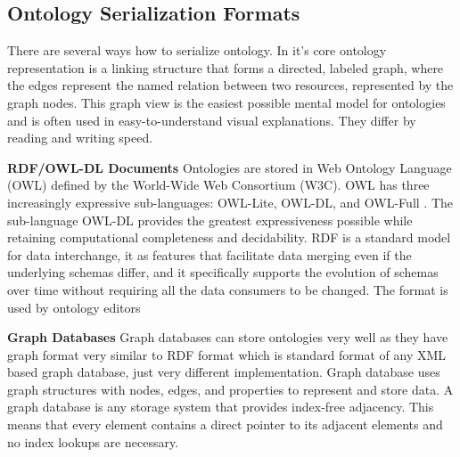 \subsection{Ontology Serialization Formats}

There are several ways how to serialize ontology. In it's core ontology representation is a linking structure that forms a directed, labeled graph, where the edges represent the named relation between two resources, represented by the graph nodes. This graph view is the easiest possible mental model for ontologies and is often used in easy-to-understand visual explanations. They differ by reading and writing speed. 


\textbf{RDF/OWL-DL Documents}
Ontologies are stored in Web Ontology Language (OWL) defined by the World-Wide Web Consortium (W3C). OWL has three increasingly expressive sub-languages: OWL-Lite, OWL-DL, and OWL-Full \cite{OWL}. The sub-language OWL-DL provides the greatest expressiveness possible while retaining computational completeness and decidability. RDF is a standard model for data interchange, it as features that facilitate data merging even if the underlying schemas differ, and it specifically supports the evolution of schemas over time without requiring all the data consumers to be changed. The format is used by ontology editors

\textbf{Graph Databases}
Graph databases can store ontologies very well as they have graph format very similar to RDF format which is standard format of any XML based graph database, just very different implementation. Graph database uses graph structures with nodes, edges, and properties to represent and store data. A graph database is any storage system that provides index-free adjacency. This means that every element contains a direct pointer to its adjacent elements and no index lookups are necessary.



